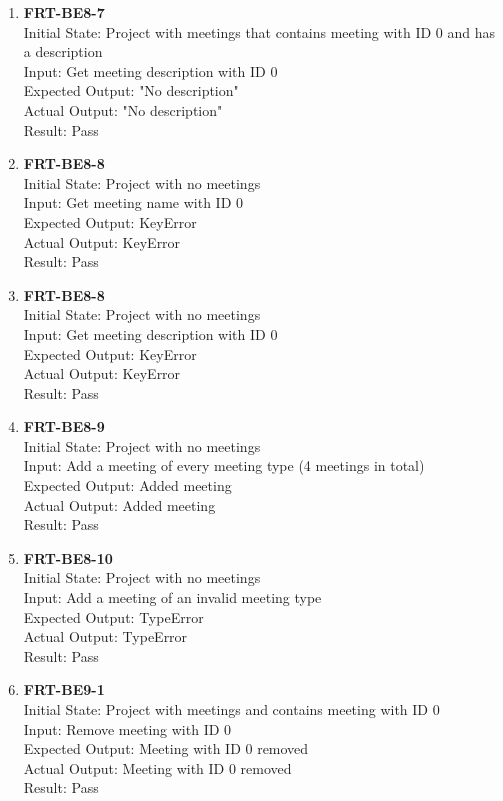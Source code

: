 \documentclass[12pt, titlepage]{article}
\begin{document}
\begin{enumerate}
    \item{\textbf{FRT-BE8-7}}\\
    Initial State: Project with meetings that contains meeting with ID 0 and has a description\\
    Input: Get meeting description with ID 0\\
    Expected Output: "No description"\\
    Actual Output: "No description"\\
    Result: Pass
    
    \item{\textbf{FRT-BE8-8}}\\
    Initial State: Project with no meetings\\
    Input: Get meeting name with ID 0\\
    Expected Output: KeyError\\
    Actual Output: KeyError\\
    Result: Pass
    
    \item{\textbf{FRT-BE8-8}}\\
    Initial State: Project with no meetings\\
    Input: Get meeting description with ID 0\\
    Expected Output: KeyError\\
    Actual Output: KeyError\\
    Result: Pass
    
    \item{\textbf{FRT-BE8-9}}\\
    Initial State: Project with no meetings\\
    Input: Add a meeting of every meeting type (4 meetings in total)\\
    Expected Output: Added meeting\\
    Actual Output: Added meeting\\
    Result: Pass
    
    \item{\textbf{FRT-BE8-10}}\\
    Initial State: Project with no meetings\\
    Input: Add a meeting of an invalid meeting type\\
    Expected Output: TypeError\\
    Actual Output: TypeError\\
    Result: Pass
    
    \item{\textbf{FRT-BE9-1}}\\
    Initial State: Project with meetings and contains meeting with ID 0\\
    Input: Remove meeting with ID 0\\
    Expected Output: Meeting with ID 0 removed\\
    Actual Output: Meeting with ID 0 removed\\
    Result: Pass
    

\end{enumerate}
\end{document}
